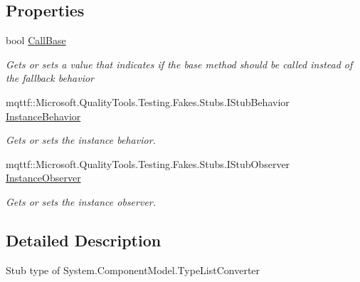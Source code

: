 \subsection*{Properties}
\begin{DoxyCompactItemize}
\item 
bool \hyperlink{class_system_1_1_component_model_1_1_fakes_1_1_stub_type_list_converter_a1369b4424729c98a6f8596e5f6f23357}{Call\-Base}
\begin{DoxyCompactList}\small\item\em Gets or sets a value that indicates if the base method should be called instead of the fallback behavior\end{DoxyCompactList}\item 
mqttf\-::\-Microsoft.\-Quality\-Tools.\-Testing.\-Fakes.\-Stubs.\-I\-Stub\-Behavior \hyperlink{class_system_1_1_component_model_1_1_fakes_1_1_stub_type_list_converter_aa45fba924ef89863c2fe16625e5edf2c}{Instance\-Behavior}
\begin{DoxyCompactList}\small\item\em Gets or sets the instance behavior.\end{DoxyCompactList}\item 
mqttf\-::\-Microsoft.\-Quality\-Tools.\-Testing.\-Fakes.\-Stubs.\-I\-Stub\-Observer \hyperlink{class_system_1_1_component_model_1_1_fakes_1_1_stub_type_list_converter_af432d410786ff755508a15cab5f10375}{Instance\-Observer}
\begin{DoxyCompactList}\small\item\em Gets or sets the instance observer.\end{DoxyCompactList}\end{DoxyCompactItemize}


\subsection{Detailed Description}
Stub type of System.\-Component\-Model.\-Type\-List\-Converter



